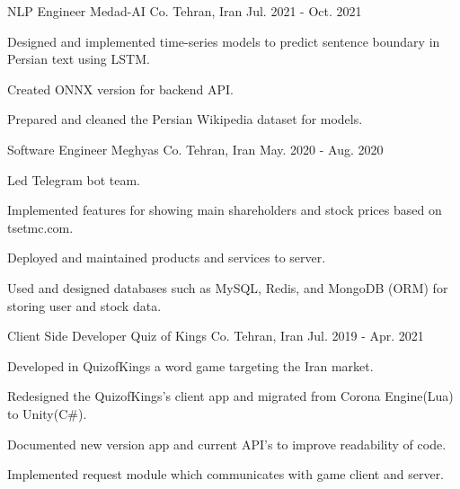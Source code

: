 

\begin{cventries}

    \cventry
    {NLP Engineer} %
    {Medad-AI Co.} %
    {Tehran, Iran} %
    {Jul. 2021 - Oct. 2021} %
    {
        \begin{cvitems} %
            \item {Designed and implemented time-series models to predict sentence boundary in Persian text using LSTM.}
            \item {Created ONNX version for backend API.}
            \item {Prepared and cleaned the Persian Wikipedia dataset for models.}
        \end{cvitems}
    }

    \cventry
    {Software Engineer} %
    {Meghyas Co.} %
    {Tehran, Iran} %
    {May. 2020 - Aug. 2020} %
    {
        \begin{cvitems} %
            \item {Led Telegram bot team.}
            \item {Implemented features for showing main shareholders and stock prices based on tsetmc.com.}
            \item {Deployed and maintained products and services to server.}
            \item {Used and designed databases such as MySQL, Redis, and MongoDB (ORM) for storing user and stock data.}
        \end{cvitems}
    }

    \cventry
    {Client Side Developer} %
    {Quiz of Kings Co.} %
    {Tehran, Iran} %
    {Jul. 2019 - Apr. 2021} %
    {
        \begin{cvitems} %
            \item {Developed in QuizofKings a word game targeting the Iran market.}
            \item {Redesigned the QuizofKings's client app and migrated from Corona Engine(Lua) to Unity(C\#).}
            \item {Documented new version app and current API's to improve readability of code.}
            \item {Implemented request module which communicates with game client and server.}
        \end{cvitems}
    }

\end{cventries}